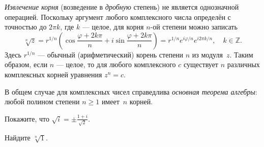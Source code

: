 \begin{labsupplement}
    \emph{Извлечение корня} (возведение в \emph{дробную} степень) не является
    однозначной операцией. Поскольку аргумент любого комплексного числа определён
    с точностью до $2\pi k$, где $k$ --- целое, для корня $n$-ой степени
    можно записать
    \begin{equation*}
        \sqrt[n]{z} = r^{1/n}\left( \cos\frac{\varphi + 2k\pi}{n} +
        i\sin\frac{\varphi + 2k\pi}{n} \right) = r^{1/n} e^{i\varphi/n}
        e^{i2\pi k/n},\quad k\in \mathbb{Z}.
    \end{equation*}
    Здесь $r^{1/n}$ --- обычный (арифметический) корень степени $n$ из модуля~$z$. 
    Таким образом, если $n$ --- целое, то для любого комплексного $c$
    существует $n$ различных комплексных корней уравнения $z^n=c$. 

    В общем случае для комплексных чисел справедлива
    \emph{основная теорема алгебры}: любой полином степени $n\ge 1$ имеет~$n$
    корней.

    \begin{lab:exercise}
     Покажите, что $\sqrt{i}=\pm \frac{1+i}{\sqrt{2}}$.
    \end{lab:exercise}
    \begin{lab:exercise}
     Найдите $\sqrt[n]{1}$.
    \end{lab:exercise}

\end{labsupplement}
